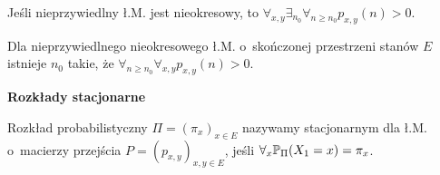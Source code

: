 	\begin{fact}
		Jeśli nieprzywiedlny ł.M. jest nieokresowy, to
		$\forall_{x,y} \exists_{n_0} \forall_{n \geq n_0} 
			p_{x,y}(n) > 0$.
	\end{fact}
	
	\begin{corollary}
		Dla nieprzywiedlnego nieokresowego ł.M. o~skończonej 
		przestrzeni stanów $E$ istnieje $n_0$ takie, że
		$\forall_{n \geq n_0} \forall_{x,y} p_{x,y}(n) > 0$.
	\end{corollary}
	
	{\bf Rozkłady stacjonarne}
	\begin{definition}
		Rozkład probabilistyczny $\Pi = (\pi_x)_{x \in E}$
		nazywamy stacjonarnym dla ł.M. o~macierzy przejścia
		$P = (p_{x,y})_{x,y \in E}$, jeśli 
		$\forall_x \P_\Pi(X_1 = x) = \pi_x$.
	\end{definition}















 
 
